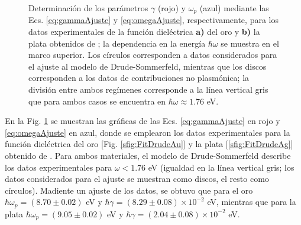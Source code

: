 \begin{figure}[h!]
\begin{subfigure}{.45\linewidth}
	\end{subfigure}\vspace*{-.7em}
	\caption{ Determinación de los parámetros $\gamma$ (rojo) y $\omega_p$ (azul) mediante las Ecs. \eqref{eq:gammaAjuste} y \eqref{eq:omegaAjuste}, respectivamente, para los datos experimentales de la función dieléctrica \textbf{a)} del oro y \textbf{b)} la plata obtenidos de \cite{johnson1972constants}; la dependencia en la energía $\hbar\omega$ se muestra en el marco superior. Los círculos corresponden a datos considerados para el ajuste al modelo de Drude-Sommerfeld, mientras que los discos corresponden a los datos de contribuciones no plasmónica; la división entre ambos regímenes corresponde a la línea vertical gris que para ambos casos se encuentra en $\hbar\omega\approx 1.76$ eV.}\label{fig:FitDrude}
	\end{figure}	

En la Fig.  \ref{fig:FitDrude} se muestran las gráficas de las Ecs. \eqref{eq:gammaAjuste} en rojo y \eqref{eq:omegaAjuste} en azul, donde se emplearon los datos experimentales para la función dieléctrica del oro [Fig. \ref{sfig:FitDrudeAu}] y la plata [\ref{sfig:FitDrudeAg}] obtenido de \cite{johnson1972constants}. Para ambos materiales, el modelo de Drude-Sommerfeld describe los datos experimentales para $\omega<1.76$ eV (igualdad en la línea vertical gris; los datos considerados para el ajuste se muestran como discos, el resto como círculos). Madiente un ajuste de los datos, se obtuvo que para el oro $\hbar\omega_p=(8.70\pm 0.02)$ eV y $\hbar\gamma = (8.29\pm 0.08)\times 10^{-2}$ eV, mientras que para la plata $\hbar\omega_p=(9.05\pm 0.02)$ eV y $\hbar\gamma = (2.04\pm 0.08)\times 10^{-2}$ eV.


